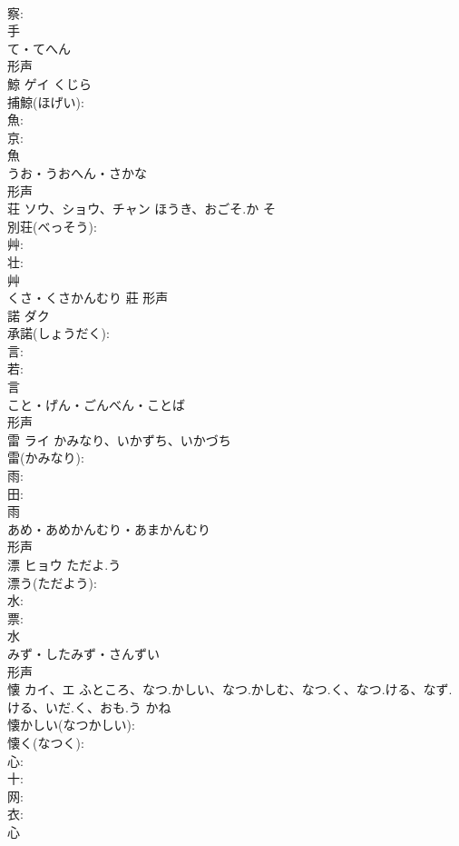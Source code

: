 \documentclass[8pt]{extreport}
\begin{document}
\begin{CJK}{UTF8}{min}
\\	察: 
\\	手	
\\	て・てへん	
\\	形声 
\\	鯨	ゲイ	くじら		
\\	捕鯨(ほげい): 
\\	魚: 
\\	京: 
\\	魚	
\\	うお・うおへん・さかな	
\\	形声 
\\	荘	ソウ、ショウ、チャン	ほうき、おごそ.か	そ	
\\	別荘(べっそう): 
\\	艸: 
\\	壮: 
\\	艸	
\\	くさ・くさかんむり	莊	形声 
\\	諾	ダク			
\\	承諾(しょうだく): 
\\	言: 
\\	若: 
\\	言	
\\	こと・げん・ごんべん・ことば	
\\	形声 
\\	雷	ライ	かみなり、いかずち、いかづち		
\\	雷(かみなり): 
\\	雨: 
\\	田: 
\\	雨	
\\	あめ・あめかんむり・あまかんむり	
\\	形声 
\\	漂	ヒョウ	ただよ.う		
\\	漂う(ただよう): 
\\	水: 
\\	票: 
\\	水	
\\	みず・したみず・さんずい	
\\	形声 
\\	懐	カイ、エ	ふところ、なつ.かしい、なつ.かしむ、なつ.く、なつ.ける、なず.ける、いだ.く、おも.う	かね	
\\	懐かしい(なつかしい): 
\\	懐く(なつく): 
\\	心: 
\\	十: 
\\	网: 
\\	衣: 
\\	心	

\end{CJK}
\end{document}

